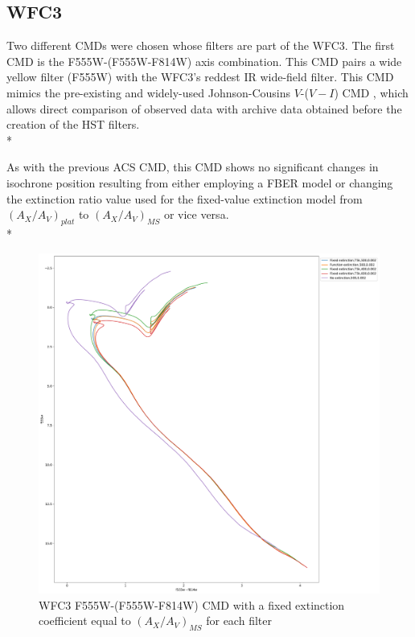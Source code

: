 \documentclass[12pt, a4paper]{report}
\begin{document}
\subsection{WFC3} \label{WFC3_isoc}

Two different CMDs were chosen whose filters are part of the WFC3. The first CMD is the F555W-(F555W-F814W) axis combination. This CMD pairs a wide yellow filter (F555W) with the WFC3's reddest IR wide-field filter. This CMD mimics the pre-existing and widely-used Johnson-Cousins $V$-($V-I$) CMD \citep{2014wfc..rept...16S}, which allows direct comparison of observed data with archive data obtained before the creation of the HST filters.\\*

As with the previous ACS CMD, this CMD shows no significant changes in isochrone position resulting from either employing a FBER model or changing the extinction ratio value used for the fixed-value extinction model from $(A_{X}/A_{V})_{plat}$ to $(A_{X}/A_{V})_{MS}$ or vice versa.\\*

\begin{figure}[h]
\begin{center}
\includegraphics[scale=0.25]{../basti_isochrones_10_13Gyr/Extinction_T5k_FeH0fix_func_f555w_f555wmf814w_500_400_600_Myr_FeH_0p002_ref_noext_Av_1p0.pdf}
\caption{WFC3 F555W-(F555W-F814W) CMD with a fixed extinction coefficient equal to $(A_{X}/A_{V})_{MS}$ for each filter}
\label{wfc3_isoc1_T5k}
\end{center}
\end{figure}
\end{document}
